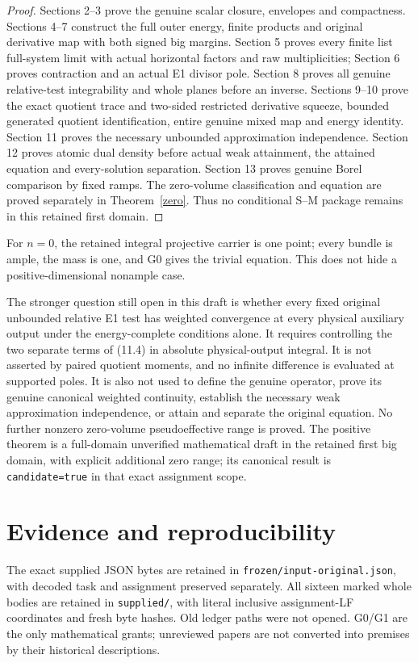 \documentclass[10pt]{article}
\begin{document}
\begin{proof}
Sections 2--3 prove the genuine scalar closure, envelopes and compactness.
Sections 4--7 construct the full outer energy, finite products and original
derivative map with both signed big margins. Section 5 proves every finite
list full-system limit with actual horizontal factors and raw multiplicities;
Section 6 proves contraction and an actual E1 divisor pole. Section 8 proves
all genuine relative-test integrability and whole planes before an inverse.
Sections 9--10 prove the exact quotient trace and two-sided restricted
derivative squeeze, bounded generated quotient identification, entire genuine
mixed map and energy identity. Section 11 proves the necessary unbounded
approximation independence. Section 12 proves atomic dual density before
actual weak attainment, the attained equation and every-solution separation.
Section 13 proves genuine Borel comparison by fixed ramps. The zero-volume
classification and equation are proved separately in Theorem~\ref{zero}.
Thus no conditional S--M package remains in this retained first domain.
\end{proof}

For $n=0$, the retained integral projective carrier is one point; every
bundle is ample, the mass is one, and G0 gives the trivial equation. This
does not hide a positive-dimensional nonample case.

The stronger question still open in this draft is whether every fixed
original unbounded relative E1 test has weighted convergence at every
physical auxiliary output under the energy-complete conditions alone.
It requires controlling the two separate terms of (11.4) in absolute
physical-output integral. It is not asserted by paired quotient moments,
and no infinite difference is evaluated at supported poles. It is also
not used to define the genuine operator, prove its genuine canonical
weighted continuity, establish the necessary weak approximation
independence, or attain and separate the original equation. No further
nonzero zero-volume pseudoeffective range is proved. The positive theorem
is a full-domain unverified mathematical draft in the retained first big
domain, with explicit additional zero range; its canonical result is
\texttt{candidate=true} in that exact assignment scope.

\appendix
\section{Evidence and reproducibility}
The exact supplied JSON bytes are retained in \texttt{frozen/input-original.json},
with decoded task and assignment preserved separately. All sixteen marked
whole bodies are retained in \texttt{supplied/}, with literal inclusive
assignment-LF coordinates and fresh byte hashes. Old ledger paths were
not opened. G0/G1 are the only mathematical grants; unreviewed papers
are not converted into premises by their historical descriptions.
\end{document}
